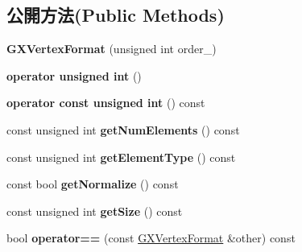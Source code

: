 \begin{DoxyCompactItemize}
\end{DoxyCompactItemize}
\subsection*{公開方法(Public Methods)}
\begin{DoxyCompactItemize}
\item 
{\bfseries G\+X\+Vertex\+Format} (unsigned int order\+\_)\hypertarget{class_i_dream_sky_1_1_g_x_vertex_format_afb6339f065a9a14207fb8313b5a9758c}{}\label{class_i_dream_sky_1_1_g_x_vertex_format_afb6339f065a9a14207fb8313b5a9758c}

\item 
{\bfseries operator unsigned int} ()\hypertarget{class_i_dream_sky_1_1_g_x_vertex_format_a663b79b4eec3b77a7879839dff97f23c}{}\label{class_i_dream_sky_1_1_g_x_vertex_format_a663b79b4eec3b77a7879839dff97f23c}

\item 
{\bfseries operator const unsigned int} () const \hypertarget{class_i_dream_sky_1_1_g_x_vertex_format_a90b33a457a00828b67f678a5e2137b4b}{}\label{class_i_dream_sky_1_1_g_x_vertex_format_a90b33a457a00828b67f678a5e2137b4b}

\item 
const unsigned int {\bfseries get\+Num\+Elements} () const \hypertarget{class_i_dream_sky_1_1_g_x_vertex_format_a043238b827c8d500bd18badf3a57ec0c}{}\label{class_i_dream_sky_1_1_g_x_vertex_format_a043238b827c8d500bd18badf3a57ec0c}

\item 
const unsigned int {\bfseries get\+Element\+Type} () const \hypertarget{class_i_dream_sky_1_1_g_x_vertex_format_a5e8773bbc9bbf81b8d661fd6e3d067ce}{}\label{class_i_dream_sky_1_1_g_x_vertex_format_a5e8773bbc9bbf81b8d661fd6e3d067ce}

\item 
const bool {\bfseries get\+Normalize} () const \hypertarget{class_i_dream_sky_1_1_g_x_vertex_format_aa1f5e1dcf86444be648d377b73b411f2}{}\label{class_i_dream_sky_1_1_g_x_vertex_format_aa1f5e1dcf86444be648d377b73b411f2}

\item 
const unsigned int {\bfseries get\+Size} () const \hypertarget{class_i_dream_sky_1_1_g_x_vertex_format_ae5cbfcb8655f112b2703f66146b67788}{}\label{class_i_dream_sky_1_1_g_x_vertex_format_ae5cbfcb8655f112b2703f66146b67788}

\item 
bool {\bfseries operator==} (const \hyperlink{class_i_dream_sky_1_1_g_x_vertex_format}{G\+X\+Vertex\+Format} \&other) const \hypertarget{class_i_dream_sky_1_1_g_x_vertex_format_aee5170aeb43d009d4df065a4009c6f05}{}\label{class_i_dream_sky_1_1_g_x_vertex_format_aee5170aeb43d009d4df065a4009c6f05}


\end{DoxyCompactItemize}
